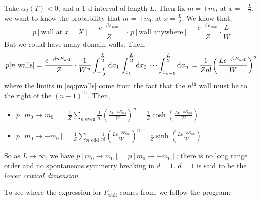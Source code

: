 \begin{examplebox}
Take $\alpha_2(T) < 0$, and a 1-d interval of length $L$. Then fix $m = +m_0$ at $x = -\tfrac{L}{2}$, we want to know the probability that $m = +m_0$ at $x = \tfrac{L}{2}$. We know that,
\begin{equation*}
p\left[\textrm{wall at } x = X\right] = \frac{e^{-\beta F_{\textrm{wall}}}}{Z} \Rightarrow p\left[\textrm{wall anywhere}\right] = \frac{e^{-\beta F_{\textrm{wall}}}}{Z} \cdot \frac{L}{W}
\end{equation*}
But we could have many domain walls. Then,
\begin{dmath}
\label{eq:pwalls}
p[n \textrm{ walls}] = \frac{e^{-\beta n F_{\textrm{wall}}}}{Z} \cdot \frac{1}{W^n}\int_{-\tfrac{L}{2}}^{\tfrac{L}{2}}{ \upd{x_1} \int_{x_1}^{\tfrac{L}{2}}{ \upd{x_2} \cdots \int_{x_{n-1}}^{\tfrac{L}{2}}{\upd{x_n}} } } = \frac{1}{Z n!}\left(\frac{Le^{-\beta F_{\textrm{wall}}}}{W}\right)^n 
\end{dmath}
where the limits in \eqref{eq:pwalls} come from the fact that the $n^{\textrm{th}}$ wall must be to the right of the $(n-1)^{\textrm{th}}$. Then,
\begin{itemize}
\item $p[m_0 \rightarrow m_0] = \tfrac{1}{Z}\sum_{n \textrm{ even}}{\tfrac{1}{n!} \left(\tfrac{Le^{-\beta F_{\textrm{wall}}}}{W}\right)^n} = \frac{1}{Z} \cosh\left(\tfrac{Le^{-\beta F_{\textrm{wall}}}}{W}\right)$
\item $p[m_0 \rightarrow -m_0] = \tfrac{1}{Z}\sum_{n \textrm{ odd}}{\tfrac{1}{n!} \left(\tfrac{Le^{-\beta F_{\textrm{wall}}}}{W}\right)^n} = \frac{1}{Z} \sinh\left(\tfrac{Le^{-\beta F_{\textrm{wall}}}}{W}\right)$
\end{itemize}
So as $L \rightarrow \infty$, we have $p[m_0 \rightarrow m_0] = p[m_0 \rightarrow -m_0]$; there is no long range order and no spontaneous symmetry breaking in $d = 1$. $d = 1$ is said to be the \emph{lower critical dimension}.
\end{examplebox}
To see where the expression for $F_{\text{wall}}$ comes from, we follow the program:
